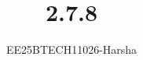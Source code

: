 \documentclass[journal]{IEEEtran}
\begin{document}

\vspace{3cm}

\title{2.7.8}
\author{EE25BTECH11026-Harsha}
 \maketitle
{\let\newpage\relax\maketitle}

\renewcommand{\thefigure}{\theenumi}
\renewcommand{\thetable}{\theenumi}
\setlength{\intextsep}{10pt} %


\renewcommand{\thetable}{\theenumi}
\end{document}
